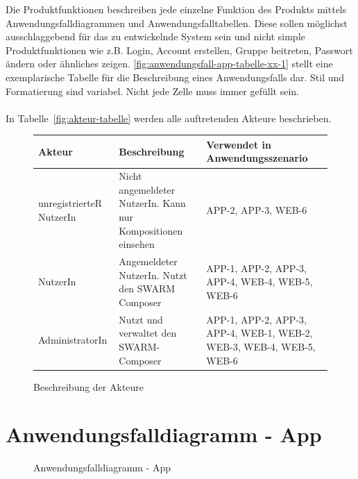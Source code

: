 \begin{tcolorbox}
Die Produktfunktionen beschreiben jede einzelne Funktion des Produkts mittels Anwendungsfalldiagrammen und Anwendungsfalltabellen.
Diese sollen möglichst ausschlaggebend für das zu entwickelnde System sein und nicht simple Produktfunktionen wie z.B. Login, Account erstellen, Gruppe beitreten, Passwort ändern oder ähnliches zeigen.
\autoref{fig:anwendungsfall-app-tabelle-xx-1} stellt eine exemplarische Tabelle für die Beschreibung eines Anwendungsfalls dar. Stil und Formatierung sind variabel. Nicht jede Zelle muss immer gefüllt sein.
\\\\
In  Tabelle~\autoref{fig:akteur-tabelle} werden alle auftretenden Akteure beschrieben.


\end{tcolorbox}

\begin{figure}[h]
	\centering

	\begin{tabularx}{\textwidth}{ p{} | p{} | X }
		\textbf{Akteur} & \textbf{Beschreibung} & \textbf{Verwendet in Anwendungsszenario} \\ \hline
		unregistrierteR NutzerIn & Nicht angemeldeter NutzerIn. Kann nur Kompositionen einsehen & APP-2, APP-3, WEB-6
		\\ \hline NutzerIn & Angemeldeter NutzerIn. Nutzt den SWARM Composer & APP-1, APP-2, APP-3, APP-4, WEB-4, WEB-5, WEB-6
		\\ \hline AdministratorIn & Nutzt und verwaltet den SWARM-Composer & APP-1, APP-2, APP-3, APP-4, WEB-1, WEB-2, WEB-3, WEB-4, WEB-5, WEB-6
	\end{tabularx}

	\caption{Beschreibung der Akteure}
	\label{fig:akteur-tabelle}
\end{figure}



\section{Anwendungsfalldiagramm - App}

\begin{figure}[h]
	\centering
	\caption{Anwendungsfalldiagramm - App}
	\label{fig:anwendungsfalldiagramm-app}
\end{figure}

